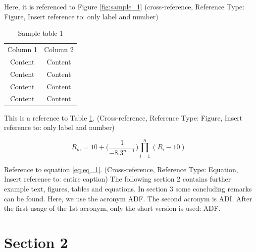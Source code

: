 \documentclass[11pt, a4paper, twoside]{report}
\begin{document}
Here, it is referenced to Figure \ref{fig:sample_1} (cross-reference, Reference Type: Figure, Insert reference to: only label and number)

\begin{table}[H]
  \centering
  \begin{tabular}{c c} 
    Column 1 & Column 2  \\ [0.5ex] 
    Content & Content \\ 
    Content & Content \\
    Content & Content \\
    Content & Content \\ [1ex] 
  \end{tabular}
  \captionsetup{font=bf, belowskip=-0.5cm}
  \caption[Sample table 1]{Sample table 1}
  \label{table:tab_1}
\end{table}

This is a reference to Table \ref{table:tab_1}. (Cross-reference, Reference Type: Figure, Insert reference to: only label and number)

\begin{equation}
	R_m = 10 + \Big(\frac{1}{-8.3^{n-1}}\Big) \displaystyle\prod_{i=1}^{n} (R_i-10)
	\label{eq:eq_1}
\end{equation}

Reference to equation \ref{eq:eq_1}. (Cross-reference, Reference Type: Equation, Insert reference to: entire caption) 
The following section 2 contains further example text, figures, tables and equations. 
In section 3 some concluding remarks can be found. Here, we use the acronym \acrfull{ADF}. The second acronym is \acrfull{ADI}. After the first usage of the 1st acronym, only the short version is used: \acrshort{ADF}.

\chapter{Section 2} \label{sec:section_2}

\thispagestyle{fancy}
\end{document}
